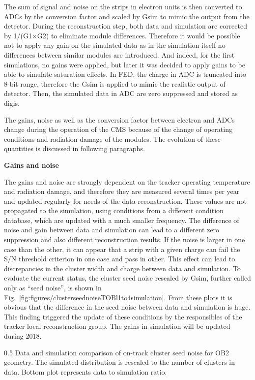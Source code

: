  The sum of signal and noise on the strips in electron units is then converted to ADCs by the conversion factor and scaled by Gsim to mimic the output from the detector. During the reconstruction step, both data and simulation are corrected by 1/(G1$\times$G2) to eliminate module differences. Therefore it would be possible not to apply any gain on the simulated data as in the simulation itself no differences between similar modules are introduced. And indeed, for the first simulations, no gains were applied, but later it was decided to apply gains to be able to simulate saturation effects. In FED, the charge in ADC is truncated into 8-bit range, therefore the Gsim is applied to mimic the realistic output of detector. Then, the simulated data in ADC are zero suppressed and stored as digis.

The gains, noise as well as the conversion factor between electron and ADCs change during the operation of the CMS because of the change of operating conditions and radiation damage of the modules. The evolution of these quantities is discussed in following paragraphs.   
 
\textbf{Gains and noise}

The gains and noise are strongly dependent on the tracker operating temperature and radiation damage, and therefore they are measured several times per year and updated regularly for needs of the data reconstruction. These values are not propagated to the simulation, using conditions from a different condition database, which are updated with a much smaller frequency. The difference of noise and gain between data and simulation can lead to a different zero suppression and also different reconstruction results. If the noise is larger in one case than the other, it can appear that a strip with a given charge can fail the S/N threshold criterion in one case and pass in other. This effect can lead to discrepancies in the cluster width and charge between data and simulation. To evaluate the current status, the cluster seed noise rescaled by Gsim, further called only as ``seed noise'', is shown in Fig.~\ref{fig:figures/clusterseednoiseTOBl1to4simulation}. From these plots it is obvious that the difference in the seed noise between data and simulation is huge. This finding triggered the update of these conditions by the responsibles of the tracker local reconstruction group. The gains in simulation will be updated during 2018.


                 {0.5}       %
                 { Data and simulation comparison of on-track cluster seed noise for OB2 geometry. The simulated distribution is rescaled to the number of clusters in data.  Bottom plot represents data to simulation ratio. }


